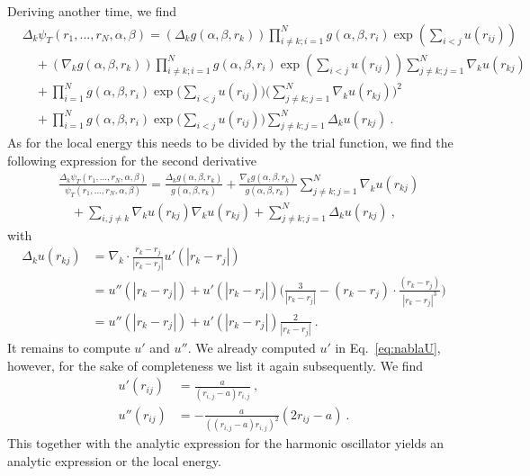 \documentclass[11pt,a4paper]{article}
\numberwithin{equation}{section}
\begin{document}
Deriving another time, we find
\begin{equation}
\label{eq:LaplaceTrialFunk}
\begin{aligned}
&\Delta_k\psi_T(r_1,...,r_N,\alpha,\beta)
=
\left(\Delta_kg(\alpha,\beta,{r}_k)\right)\prod_{i\neq k;i=1}^N g(\alpha,\beta,{r}_i)\exp{\left(\sum_{i<j}u(r_{ij})\right)}\\
&\quad +
\left(\nabla_kg(\alpha,\beta,{r}_k)\right)\prod_{i\neq k;i=1}^N g(\alpha,\beta,{r}_i)\exp\left(\sum_{i<j}u(r_{ij})\right)\sum_{j\neq k;j=1}^N\nabla_k u(r_{kj})\\
&\quad +
\prod_{i=1}^N g(\alpha,\beta,{r}_i)\exp{\Bigg(\sum_{i<j}u(r_{ij})\Bigg)}\Bigg(\sum_{j\neq k;j=1}^N\nabla_k u(r_{kj})\Bigg)^2\\
&\quad +
\prod_{i=1}^N g(\alpha,\beta,{r}_i)\exp{\Bigg(\sum_{i<j}u(r_{ij})\Bigg)}\sum_{j\neq k;j=1}^N\Delta_k u(r_{kj})~.
\end{aligned}
\end{equation}
As for the local energy this needs to be divided by the trial function, we find the following expression for the second derivative
\begin{equation}
\label{eq:LaplaceTrialFunkQuot}
\begin{aligned}
&\frac{\Delta_k\psi_T(r_1,...,r_N,\alpha,\beta)}{\psi_T(r_1,...,r_N,\alpha,\beta)}
=
\frac{\Delta_kg(\alpha,\beta,{r}_k)}{g(\alpha,\beta,{r}_k)}
+
\frac{\nabla_kg(\alpha,\beta,{r}_k)}{g(\alpha,\beta,{r}_k)}\sum_{j\neq k;j=1}^N\nabla_k u(r_{kj})\\
&\quad +
\sum_{i,j\neq k}\nabla_k u(r_{kj})\nabla_k u(r_{kj})
+
\sum_{j\neq k;j=1}^N\Delta_k u(r_{kj})~,
\end{aligned}
\end{equation}
with 
\begin{align*}
\Delta_ku(r_{kj})
&=
\nabla_k\cdot \frac{r_k-r_j}{|r_k-r_j|}u'(|r_k-r_j|)\\
&=
u''(|r_k-r_j|)
+
u'(|r_k-r_j|)\Bigg(
\frac{3}{|r_k-r_j|}
-(r_k-r_j)\cdot\frac{(r_k-r_j)}{|r_k-r_j|^3}
\Bigg)\\
&=
u''(|r_k-r_j|)
+
u'(|r_k-r_j|)
\frac{2}{|r_k-r_j|}~.
\end{align*}
It remains to compute $u'$ and $u''$.
%
We already computed $u'$ in Eq.~\eqref{eq:nablaU}, however, for the sake of completeness we list it again subsequently.
%
We find
\begin{align*}
u'(r_{ij})&=\frac{a}{(r_{i,j}-a)r_{i,j}}~,\\
u''(r_{ij})&=-\frac{a}{((r_{i,j}-a)r_{i,j})^2}(2r_{ij}-a)~.
\end{align*} 
This together with the analytic expression for the harmonic oscillator yields an analytic expression or the local energy.
\end{document}
